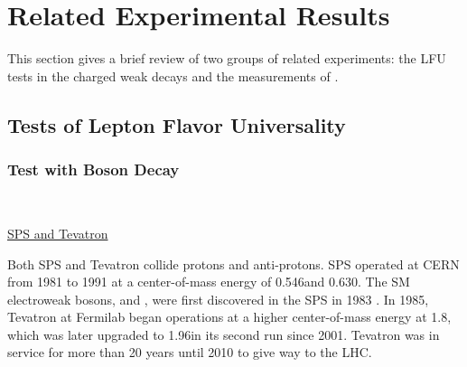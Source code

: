 \section{Related Experimental Results}
\label{sec:introduction:relatedWorks}

This section gives a brief review of two groups of related experiments: the LFU tests in the charged weak decays and the measurements of \absVcs.

\subsection{Tests of Lepton Flavor Universality}
\label{sec:introduction:relatedWorks:lu}


\subsubsection{Test with \PW Boson Decay} 
~




\underline{SPS and Tevatron}

Both SPS and Tevatron collide protons and anti-protons. SPS operated at CERN from 1981 to 1991 at a center-of-mass energy of 0.546\TeV and 0.630\TeV. The SM electroweak bosons, \PW and \PZ, were first discovered in the SPS in 1983 \cite{ARNISON1983103, BANNER1983476}. In 1985, Tevatron at Fermilab began operations at a higher center-of-mass energy at 1.8\TeV, which was later upgraded to 1.96\TeV in its second run since 2001. Tevatron was in service for more than 20 years until 2010 to give way to the LHC. 


